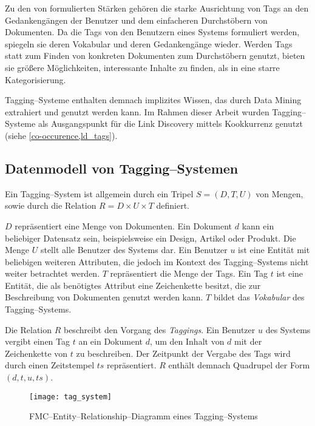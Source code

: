 Zu den von \textcite{ma2004} formulierten Stärken gehören die starke Ausrichtung von Tags an den Gedankengängen der Benutzer und dem einfacheren Durchstöbern von Dokumenten. Da die Tags von den Benutzern eines Systems formuliert werden, spiegeln sie deren Vokabular und deren Gedankengänge wieder. Werden Tags statt zum Finden von konkreten Dokumenten zum Durchstöbern genutzt, bieten sie größere Möglichkeiten, interessante Inhalte zu finden, als in eine starre Kategorisierung.

Tagging--Systeme enthalten demnach implizites Wissen, das durch Data Mining extrahiert und genutzt werden kann. Im Rahmen dieser Arbeit wurden Tagging--Systeme als Ausgangspunkt für die Link Discovery mittels Kookkurrenz genutzt (siehe \cref{co-occurence,ld_tags}).

\subsection{Datenmodell von Tagging--Systemen}
\label{tagging_data}

Ein Tagging--System ist allgemein durch ein Tripel \(S=(D, T, U)\) von Mengen, sowie durch die Relation \(R = D \times U \times T\) definiert. 

\(D\) repräsentiert eine Menge von Dokumenten. Ein Dokument \(d\) kann ein beliebiger Datensatz sein, beispielsweise ein Design, Artikel oder Produkt. Die Menge \(U\) stellt alle Benutzer des Systems dar. Ein Benutzer \(u\) ist eine Entität mit beliebigen weiteren Attributen, die jedoch im Kontext des Tagging--Systems nicht weiter betrachtet werden. \(T\) repräsentiert die Menge der Tags. Ein Tag \(t\) ist eine Entität, die als benötigtes Attribut eine Zeichenkette besitzt, die zur Beschreibung von Dokumenten genutzt werden kann. \(T\) bildet das \emph{Vokabular} des Tagging--Systems.

Die Relation \(R\) beschreibt den Vorgang des \emph{Taggings}. Ein Benutzer \(u\) des Systems vergibt einen Tag \(t\) an ein Dokument \(d\), um den Inhalt von \(d\) mit der Zeichenkette von \(t\) zu beschreiben. Der Zeitpunkt der Vergabe des Tags wird durch einen Zeitstempel \(ts\) repräsentiert. \(R\) enthält demnach Quadrupel der Form \((d,t,u,ts)\).

\begin{figure}
\centering
\texttt{[image: tag\_system]}
\caption{FMC--Entity--Relationship--Diagramm eines Tagging--Systems}
\label{fig:tagging_erd}
\end{figure}


